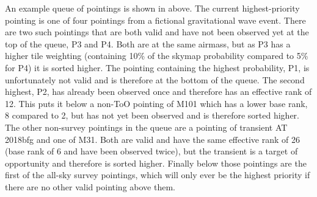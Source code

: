 \begin{colsection}
\begin{colsection}
An example queue of pointings is shown in  above. The current highest-priority pointing is one of four pointings from a fictional gravitational wave event. There are two such pointings that are both valid and have not been observed yet at the top of the queue, P3 and P4. Both are at the same airmass, but as P3 has a higher tile weighting (containing 10\% of the skymap probability compared to 5\% for P4) it is sorted higher. The pointing containing the highest probability, P1, is unfortunately not valid and is therefore at the bottom of the queue. The second highest, P2, has already been observed once and therefore has an effective rank of 12. This puts it below a non-ToO pointing of M101 which has a lower base rank, 8 compared to 2, but has not yet been observed and is therefore sorted higher. The other non-survey pointings in the queue are a pointing of transient AT 2018bfg and one of M31. Both are valid and have the same effective rank of 26 (base rank of 6 and have been observed twice), but the transient is a target of opportunity and therefore is sorted higher. Finally below those pointings are the first of the all-sky survey pointings, which will only ever be the highest priority if there are no other valid pointing above them.

\end{colsection}


\end{colsection}


